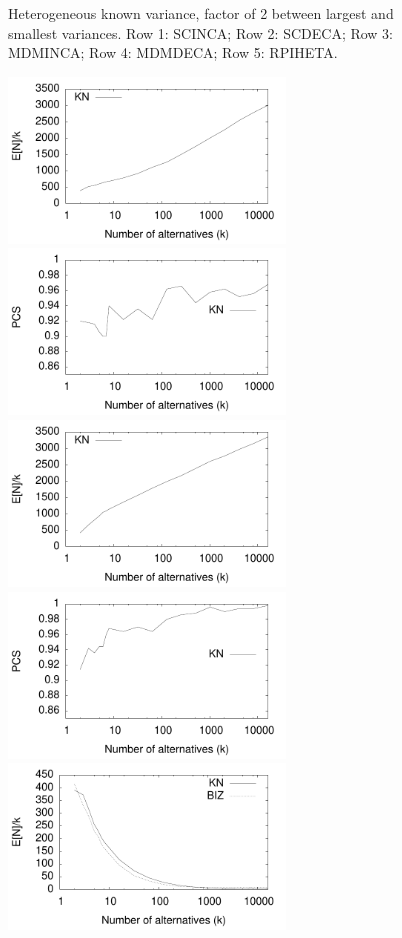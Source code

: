 \documentclass[12pt]{article}
\begin{document}
\begin{figure}[tb]
    \caption{Heterogeneous known variance, factor of 2 between largest and smallest variances. 
    Row 1: SCINCA;
    Row 2: SCDECA;
    Row 3: MDMINCA;
    Row 4: MDMDECA;
    Row 5: RPIHETA.
    }
  \end{figure}

  \begin{figure}[tb]
    \center
    \includegraphics[width=2.9in]{pdf/FINAL-SCINC-Nk} 
    \includegraphics[width=2.9in]{pdf/FINAL-SCINC-PCS}
    \includegraphics[width=2.9in]{pdf/FINAL-SCDEC-Nk} 
    \includegraphics[width=2.9in]{pdf/FINAL-SCDEC-PCS}
    \includegraphics[width=2.9in]{pdf/FINAL-MDMINC-Nk} 

\end{figure}
\end{document}

